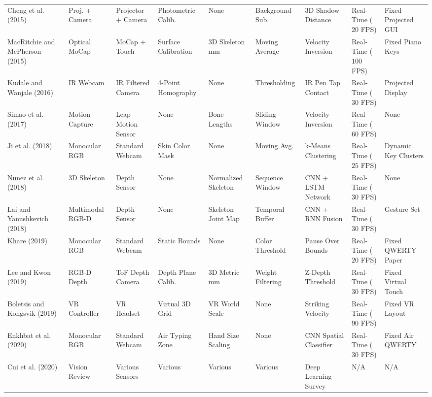 \begin{table}[htbp]
\begin{tabular}{l l l l l l l l l}
Cheng et al. (2015) \cite{Cheng2015Fingertip} & Proj. + Camera & Projector + Camera & Photometric Calib. & None & Background Sub. & 3D Shadow Distance & Real-Time ($20$ FPS) & Fixed Projected GUI \\
MacRitchie and McPherson (2015) \cite{MacRitchie2015Integrating} & Optical MoCap & MoCap + Touch & Surface Calibration & 3D Skeleton mm & Moving Average & Velocity Inversion & Real-Time ($100$ FPS) & Fixed Piano Keys \\
Kudale and Wanjale (2016) \cite{Kudale2016RealTime} & IR Webcam & IR Filtered Camera & 4-Point Homography & None & Thresholding & IR Pen Tap Contact & Real-Time ($30$ FPS) & Projected Display \\
Simao et al. (2017) \cite{Simao2016Unsupervised} & Motion Capture & Leap Motion Sensor & None & Bone Lengths & Sliding Window & Velocity Inversion & Real-Time ($60$ FPS) & None \\
Ji et al. (2018) \cite{Ji2018Local} & Monocular RGB & Standard Webcam & Skin Color Mask & None & Moving Avg. & k-Means Clustering & Real-Time ($25$ FPS) & Dynamic Key Clusters \\
Nunez et al. (2018) \cite{Nunez2018Convolutional} & 3D Skeleton & Depth Sensor & None & Normalized Skeleton & Sequence Window & CNN + LSTM Network & Real-Time ($30$ FPS) & None \\
Lai and Yanushkevich (2018) \cite{Lai2018CNN} & Multimodal RGB-D & Depth Sensor & None & Skeleton Joint Map & Temporal Buffer & CNN + RNN Fusion & Real-Time ($30$ FPS) & Gesture Set \\
Khare (2019) \cite{Khare2019QWERTY} & Monocular RGB & Standard Webcam & Static Bounds & None & Color Threshold & Pause Over Bounds & Real-Time ($20$ FPS) & Fixed QWERTY Paper \\
Lee and Kwon (2019) \cite{Lee2019Virtual} & RGB-D Depth & ToF Depth Camera & Depth Plane Calib. & 3D Metric mm & Weight Filtering & Z-Depth Threshold & Real-Time ($30$ FPS) & Fixed Virtual Touch \\
Boletsis and Kongsvik (2019) \cite{Boletsis2019TextInput} & VR Controller & VR Headset & Virtual 3D Grid & VR World Scale & None & Striking Velocity & Real-Time ($90$ FPS) & Fixed VR Layout \\
Enkhbat et al. (2020) \cite{Enkhbat2020HandKey} & Monocular RGB & Standard Webcam & Air Typing Zone & Hand Size Scaling & None & CNN Spatial Classifier & Real-Time ($30$ FPS) & Fixed Air QWERTY \\
Cui et al. (2020) \cite{Cui2020Deep} & Vision Review & Various Sensors & Various & Various & Various & Deep Learning Survey & N/A & N/A \\

\end{tabular}
\end{table}
